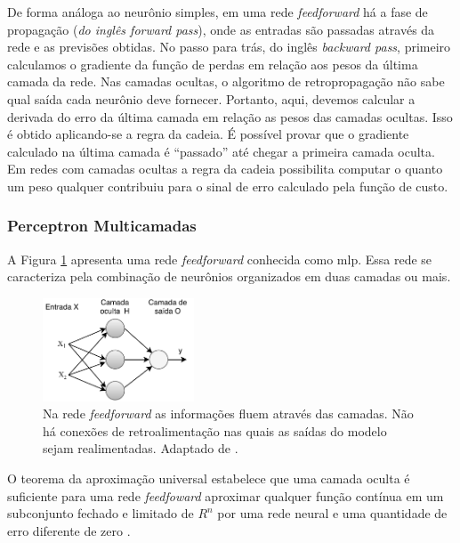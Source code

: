 De forma análoga ao neurônio simples, em uma rede \textit{feedforward} há a fase de propagação (\textit{do inglês forward pass}), onde as entradas são passadas através da rede e as previsões obtidas. No passo para trás, do inglês \textit{backward pass}, primeiro calculamos o gradiente da função de perdas em relação aos pesos da última camada da rede.
Nas camadas ocultas, o algoritmo de retropropagação não sabe qual saída cada neurônio deve fornecer. Portanto, aqui, devemos calcular a derivada do erro da última camada em relação as pesos das camadas ocultas. Isso é obtido aplicando-se a regra da cadeia. É possível provar que o gradiente calculado na última camada é ``passado'' até chegar a primeira camada oculta.    
Em redes com camadas ocultas a regra da cadeia possibilita computar o quanto um peso qualquer contribuiu para o sinal de erro calculado pela função de custo.  

\subsubsection{Perceptron Multicamadas}

A Figura \ref{fig:feedforward} apresenta uma rede \textit{feedforward} conhecida como \gls{mlp}. Essa rede se caracteriza pela combinação de neurônios organizados em duas camadas ou mais. 

\begin{figure}[h]
	\centering
	\includegraphics[width=0.4\textwidth]{figuras/feedforward.pdf}
	\caption[Rede \textit{feedforward} de 2 camadas]{Na rede \textit{feedforward} as informações fluem através das camadas. Não há conexões de retroalimentação nas quais as saídas do modelo sejam realimentadas. Adaptado de \cite{Goodfellow2016}.}
	\label{fig:feedforward}
\end{figure}


O teorema da aproximação universal \cite{hornik1989multilayer} estabelece que uma camada oculta é suficiente para uma rede \textit{feedfoward} aproximar qualquer função contínua em um subconjunto fechado e limitado de $R^{n}$ por uma rede neural e uma quantidade de erro diferente de zero \cite{Goodfellow2016}.

